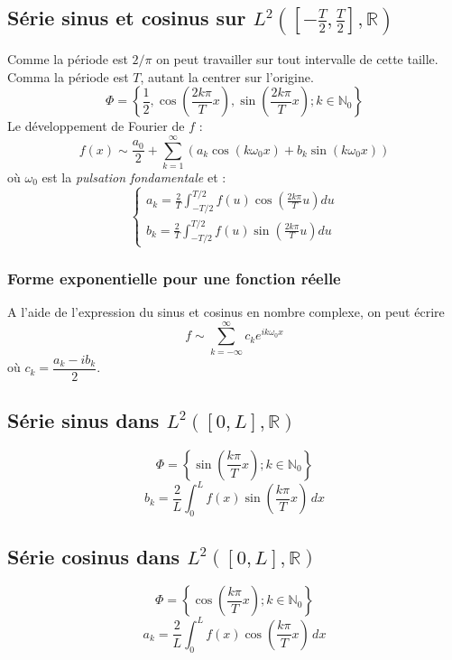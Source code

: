 \documentclass[11pt, a4paper, openany]{book}
\newcommand{\serie}{\sum_{k=1}^\infty}
\begin{document}
		\subsection{Série sinus et cosinus sur $L^2([-\frac{T}{2}, \frac{T}{2}], \mathbb{R})$}
		Comme la période est $2/\pi$ on peut travailler sur tout  intervalle de cette taille. Comma la période est $T$, autant la centrer sur l'origine.
		\begin{equation}
			\Phi = \left\{ \frac{1}{2}, \cos\left(\frac{2k\pi}{T}x\right), \sin\left(\frac{2k\pi}{T}x\right) ; k \in \mathbb{N}_0\right\}
		\end{equation}
		Le développement de Fourier de $f$ :
		\begin{equation}
			f(x) \sim \frac{a_0}{2} + \serie (a_k\cos(k\omega_0x) + b_k\sin(k\omega_0x))
		\end{equation}
		où $\omega_0$ est la \textit{pulsation fondamentale} et :
		\begin{equation}
			\left\{\begin{array}{l}
			a_k = \frac{2}{T}\int_{-T/2}^{T/2} f(u)\cos\left(\frac{2k\pi}{T}u\right)du\\
			b_k = \frac{2}{T}\int_{-T/2}^{T/2} f(u)\sin\left(\frac{2k\pi}{T}u\right)du
			\end{array}\right.
		\end{equation}
									
		\subsubsection{Forme exponentielle pour une fonction réelle}
		A l'aide de l'expression du sinus et cosinus en nombre complexe, on peut écrire 
		\begin{equation}
			f \sim \sum_{k=-\infty}^\infty c_ke^{ik\omega_0x}
		\end{equation}
		où $c_k = \dfrac{a_k - ib_k}{2}$.
									
		\subsection{Série sinus dans $L^2([0, L], \mathbb{R})$} 
		\begin{equation}
			\Phi = \left\{\sin\left(\frac{k\pi}{T}x\right) ; k \in \mathbb{N}_0\right\}
		\end{equation}
		\begin{equation}
			b_k=\frac{2}{L}\int_0^Lf(x)\sin\left(\frac{k\pi}{T}x\right)\,dx
		\end{equation}
		\subsection{Série cosinus dans $L^2([0, L], \mathbb{R})$} 
		\begin{equation}
			\Phi = \left\{\cos\left(\frac{k\pi}{T}x\right) ; k \in \mathbb{N}_0\right\}
		\end{equation}
		\begin{equation}
			a_k=\frac{2}{L}\int_0^Lf(x)\cos\left(\frac{k\pi}{T}x\right)\,dx
		\end{equation}
									
\end{document}

